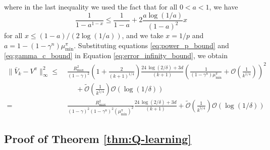 \documentclass[letterpaper, 10 pt]{article}
\begin{document}
where in the last inequality we used the fact that for all $0<a<1$, we have
\[ \frac{1}{1-a^{1-x}}\leq \frac{1}{1-a}+2\frac{a\log(1/a)}{(1-a)^2}x \]
for all $x\leq (1-a)/(2\log(1/a))$, and we take $x=1/p$ and $a=1-(1-\gamma^n)\mu^\pi_{\min}$. Substituting equations \eqref{eq:power_p_bound} and \eqref{eq:gamma_c_bound} in Equation \eqref{eq:error_infinity_bound}, we obtain
\begin{align*}
\|\bar{V}_k-V^\pi\|_{\infty}^2 \le\; & \frac{R_{\max}^2}{(1-\gamma)^2}\left(1+ \frac{2}{(k+1)^{1/4}}\right)\frac{24 \,\log(2/\delta)+3 d }{(k+1)} \left( \frac{1}{(1-\gamma^n)\mu^\pi_{\min}} + \mathcal{O}\left(\frac{1}{k^{1/4}}\right)\right)^2 \\
&\quad~+ \tilde{\mathcal{O}}\left(\frac{1}{k^{5/4}}  \right) \mathcal{O}(\log(1/\delta))\\
=\; & \frac{R_{\max}^2}{(1-\gamma)^2(1-\gamma^n)^2(\mu^\pi_{\min})^2}\frac{24 \,\log(2/\delta)+3 d }{(k+1)} + \tilde{\mathcal{O}}\left(\frac{1}{k^{5/4}}  \right) \mathcal{O}(\log(1/\delta))
\end{align*}






\subsection{Proof of Theorem \ref{thm:Q-learning}} \label{proof:Q-learning}
\end{document}
